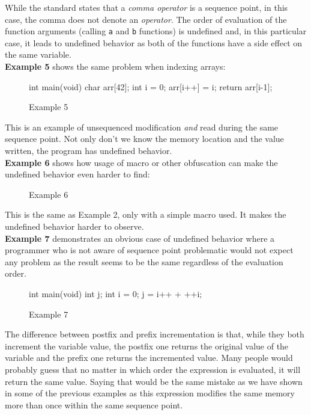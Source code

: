 While the standard states that a \emph{comma operator} is a sequence point, in this case, the comma does not denote an \emph{operator}. The order of evaluation of the function arguments (calling \verb|a| and \verb|b| functions) is undefined and, in this particular case, it leads to undefined behavior as both of the functions have a side effect on the same variable.
\\

\textbf{Example 5} shows the same problem when indexing arrays:

\begin{figure}[h!]
\caption{Example 5}
\begin{code}
int main(void){
    char arr[42];
    int i = 0;
    arr[i++] = i;
    return arr[i-1];
}
\end{code}
\end{figure}

This is an example of unsequenced modification \emph{and} read during the same sequence point. Not only don't we know the memory location and the value written, the program has undefined behavior.
\\

\textbf{Example 6} shows how usage of macro or other obfuscation can make the undefined behavior even harder to find:

\begin{figure}[h!]
\caption{Example 6}
\begin{code}
#define MACRO i = (*j)++;
int main(){
  int i = 0;
  int *j = &i;
  MACRO
  return i;
}
}
\end{code}
\end{figure}

This is the same as Example 2, only with a simple macro used. It makes the undefined behavior harder to observe.
\\

\textbf{Example 7} demonstrates an obvious case of undefined behavior where a programmer who is not aware of sequence point problematic would not expect any problem as the result seems to be the same regardless of the evaluation order.

\begin{figure}[h!]
\caption{Example 7}
\begin{code}
int main(void){
    int j;
    int i = 0;
    j = i++ + ++i;
}
\end{code}
\end{figure}

The difference between postfix and prefix incrementation is that, while they both increment the variable value, the postfix one returns the original value of the variable and the prefix one returns the incremented value. Many people would probably guess that no matter in which order the expression is evaluated, it will return the same value. Saying that would be the same mistake as we have shown in some of the previous examples as this expression modifies the same memory more than once within the same sequence point.

